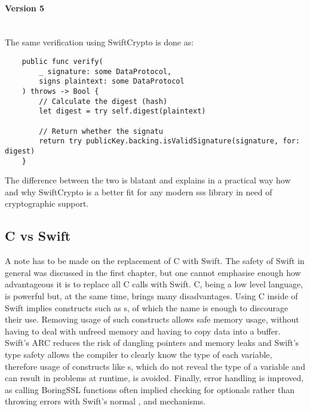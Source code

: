 \paragraph{Version 5} \mbox{} \\
The same verification using SwiftCrypto is done as:
\begin{verbatim}
    public func verify(
        _ signature: some DataProtocol, 
        signs plaintext: some DataProtocol
    ) throws -> Bool {
        // Calculate the digest (hash)
        let digest = try self.digest(plaintext)

        // Return whether the signatu
        return try publicKey.backing.isValidSignature(signature, for: digest)
    }
\end{verbatim}
\cite{jwtkit}
The difference between the two is blatant and explains in a practical way how and why SwiftCrypto is a better fit for any modern \gls{sss} library in need of cryptographic support.

\subsection{C vs Swift}
A note has to be made on the replacement of C with Swift. The safety of Swift in general was discussed in the first chapter, but one cannot emphasise enough how advantageous it is to replace all C calls with Swift. C, being a low level language, is powerful but, at the same time, brings many disadvantages. Using C inside of Swift implies constructs such as s, of which the name is enough to discourage their use. Removing usage of such constructs allows safe memory usage, without having to deal with unfreed memory and having to copy data into a buffer. Swift's ARC reduces the risk of dangling pointers and memory leaks and Swift's type safety allows the compiler to clearly know the type of each variable, therefore usage of constructs like s, which do not reveal the type of a variable and can result in problems at runtime, is avoided. Finally, error handling is improved, as calling BoringSSL functions often implied checking for optionals rather than throwing errors with Swift's normal ,  and  mechanisms.


